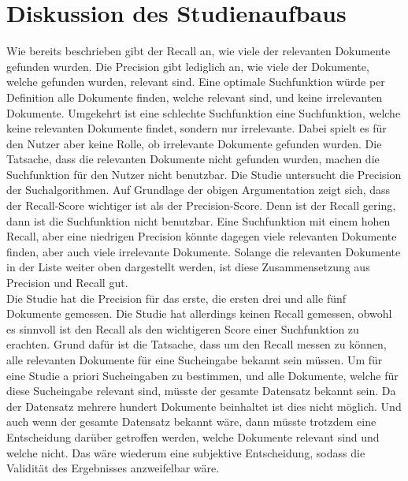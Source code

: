 \section{Diskussion des Studienaufbaus}
Wie bereits beschrieben gibt der Recall an, wie viele der relevanten Dokumente gefunden wurden.
Die Precision gibt lediglich an, wie viele der Dokumente, welche gefunden wurden, relevant sind.
Eine optimale Suchfunktion würde per Definition alle Dokumente finden, welche relevant sind, und keine irrelevanten Dokumente.
Umgekehrt ist eine schlechte Suchfunktion eine Suchfunktion, welche keine relevanten Dokumente findet, sondern nur irrelevante.
Dabei spielt es für den Nutzer aber keine Rolle, ob irrelevante Dokumente gefunden wurden.
Die Tatsache, dass die relevanten Dokumente nicht gefunden wurden, machen die Suchfunktion für den Nutzer nicht benutzbar. 
Die Studie untersucht die Precision der Suchalgorithmen.
Auf Grundlage der obigen Argumentation zeigt sich, dass der Recall-Score wichtiger ist als der Precision-Score.
Denn ist der Recall gering, dann ist die Suchfunktion nicht benutzbar.
Eine Suchfunktion mit einem hohen Recall, aber eine niedrigen Precision könnte dagegen viele relevanten Dokumente finden, aber auch viele irrelevante Dokumente.
Solange die relevanten Dokumente in der Liste weiter oben dargestellt werden, ist diese Zusammensetzung aus Precision und Recall gut.\\

Die Studie hat die Precision für das erste, die ersten drei und alle fünf Dokumente gemessen.
Die Studie hat allerdings keinen Recall gemessen, obwohl es sinnvoll ist den Recall als den wichtigeren Score einer Suchfunktion zu erachten.
Grund dafür ist die Tatsache, dass um den Recall messen zu können, alle relevanten Dokumente für eine Sucheingabe bekannt sein müssen.
Um für eine Studie a priori Sucheingaben zu bestimmen, und alle Dokumente, welche für diese Sucheingabe relevant sind, müsste der gesamte Datensatz bekannt sein.
Da der Datensatz mehrere hundert Dokumente beinhaltet ist dies nicht möglich.
Und auch wenn der gesamte Datensatz bekannt wäre, dann müsste trotzdem eine Entscheidung darüber getroffen werden, welche Dokumente relevant sind und welche nicht.
Das wäre wiederum eine subjektive Entscheidung, sodass die Validität des Ergebnisses anzweifelbar wäre.

